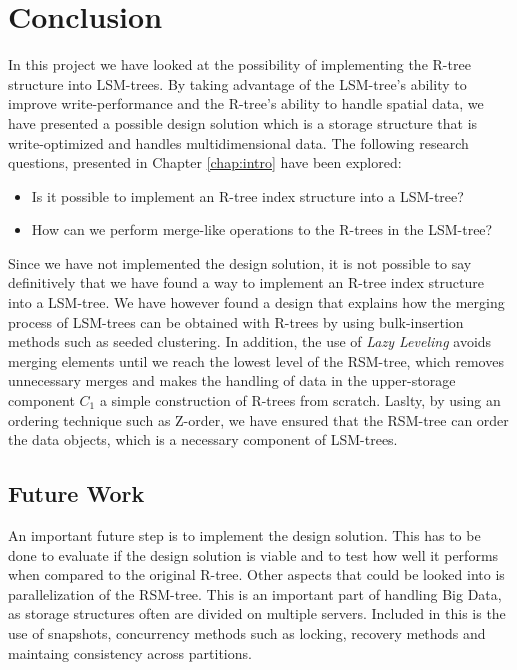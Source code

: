 \chapter{Conclusion}
In this project we have looked at the possibility of implementing the R-tree structure into LSM-trees. By taking advantage of the LSM-tree's ability to improve write-performance and the R-tree's ability to handle spatial data, we have presented a possible design solution which is a storage structure that is write-optimized and handles multidimensional data. The following research questions, presented in Chapter \ref{chap:intro} have been explored: 

\begin{itemize}
    \item Is it possible to implement an R-tree index structure into a LSM-tree?
    \item How can we perform merge-like operations to the R-trees in the LSM-tree?
\end{itemize}

\noindent
Since we have not implemented the design solution, it is not possible to say definitively that we have found a way to implement an R-tree index structure into a LSM-tree. We have however found a design that explains how the merging process of LSM-trees can be obtained with R-trees by using bulk-insertion methods such as seeded clustering. In addition, the use of \emph{Lazy Leveling} avoids merging elements until we reach the lowest level of the RSM-tree, which removes unnecessary merges and makes the handling of data in the upper-storage component $C_1$ a simple construction of R-trees from scratch. Laslty, by using an ordering technique such as Z-order, we have ensured that the RSM-tree can order the data objects, which is a necessary component of LSM-trees.  


\section{Future Work}
An important future step is to implement the design solution. This has to be done to evaluate if the design solution is viable and to test how well it performs when compared to the original R-tree. Other aspects that could be looked into is parallelization of the RSM-tree. This is an important part of handling Big Data, as storage structures often are divided on multiple servers. Included in this is the use of snapshots, concurrency methods such as locking, recovery methods and maintaing consistency across partitions. 

